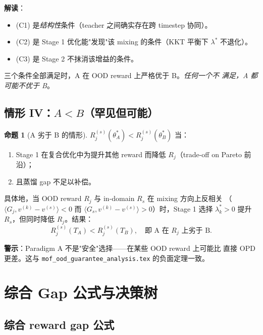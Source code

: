 \documentclass[11pt,a4paper]{article}
\theoremstyle{definition}
\newtheorem{proposition}{命题}
\begin{document}
\textbf{解读}：
\begin{itemize}[leftmargin=1.5em]
\item (C1) 是\emph{结构性}条件（teacher 之间确实存在跨 timestep 协同）。
\item (C2) 是 Stage 1 优化能"发现"该 mixing 的条件（KKT 平衡下 $\lambda^*$ 不退化）。
\item (C3) 是 Stage 2 不抹消该增益的条件。
\end{itemize}

三个条件全部满足时，A 在 OOD reward 上严格优于 B。\emph{任何一个不
满足，A 都可能不优于 B}。

\subsection{情形 IV：$A < B$（罕见但可能）}

\begin{proposition}[A 劣于 B 的情形]
\label{prop:A_worse}
$R_j^{(s)}(\theta_A^*) < R_j^{(s)}(\theta_B^*)$ 当：
\begin{enumerate}[leftmargin=1.5em]
\item Stage 1 在复合优化中为提升其他 reward 而降低 $R_j$（trade-off
on Pareto 前沿）；
\item 且蒸馏 gap 不足以补偿。
\end{enumerate}
具体地，当 OOD reward $R_j$ 与 in-domain $R_s$ 在 mixing 方向上反相关
（$\langle G_j, v^{(k)} - v^{(s)}\rangle < 0$ 而
$\langle G_s, v^{(k)} - v^{(s)}\rangle > 0$）时，Stage 1 选择
$\lambda_k^* > 0$ 提升 $R_s$，但同时降低 $R_j$。结果：
\begin{equation}
R_j^{(s)}(T_A) < R_j^{(s)}(T_B), \quad \text{即 A 在 } R_j \text{ 上劣于 B}.
\end{equation}
\end{proposition}

\textbf{警示}：Paradigm A 不是"安全"选择——在某些 OOD reward 上可能比
直接 OPD 更差。这与
\texttt{mof\_ood\_guarantee\_analysis.tex} 的负面定理一致。

\section{综合 Gap 公式与决策树}
\label{sec:summary}

\subsection{综合 reward gap 公式}
\end{document}
